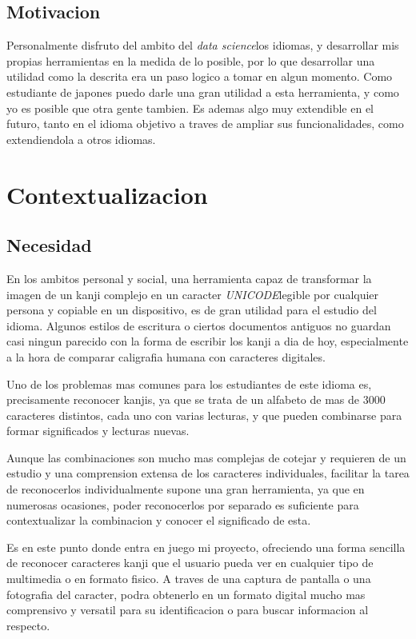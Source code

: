 \documentclass{article}
\begin{document}
\subsection{Motivacion}
Personalmente disfruto del ambito del \textit{data science}\rep  los idiomas, y desarrollar mis propias herramientas en la medida de lo posible, por lo que desarrollar una utilidad como la descrita era un paso logico a tomar en algun momento. Como estudiante de japones puedo darle una gran utilidad a esta herramienta, y como yo es posible que otra gente tambien. Es ademas algo muy extendible en el futuro, tanto en el idioma objetivo a traves de ampliar sus funcionalidades, como extendiendola a otros idiomas.


\newpage

\section{Contextualizacion}

\subsection{Necesidad}
En los ambitos personal y social, una herramienta capaz de transformar la imagen de un kanji complejo en un caracter \textit{UNICODE}\rep  legible por cualquier persona y copiable en un dispositivo, es de gran utilidad para el estudio del idioma. Algunos estilos de escritura o ciertos documentos antiguos no guardan casi ningun parecido con la forma de escribir los kanji a dia de hoy, especialmente a la hora de comparar caligrafia humana con caracteres digitales.

Uno de los problemas mas comunes para los estudiantes de este idioma es, precisamente reconocer kanjis, ya que se trata de un alfabeto de mas de 3000 caracteres distintos, cada uno con varias lecturas, y que pueden combinarse para formar significados y lecturas nuevas. 

Aunque las combinaciones son mucho mas complejas de cotejar y requieren de un estudio y una comprension extensa de los caracteres individuales, facilitar la tarea de reconocerlos individualmente supone una gran herramienta, ya que en numerosas ocasiones, poder reconocerlos por separado es suficiente para contextualizar la combinacion y conocer el significado de esta.

Es en este punto donde entra en juego mi proyecto, ofreciendo una forma sencilla de reconocer caracteres kanji que el usuario pueda ver en cualquier tipo de multimedia o en formato fisico. A traves de una captura de pantalla o una fotografia del caracter, podra obtenerlo en un formato digital mucho mas comprensivo y versatil para su identificacion o para buscar informacion al respecto.
\end{document}
